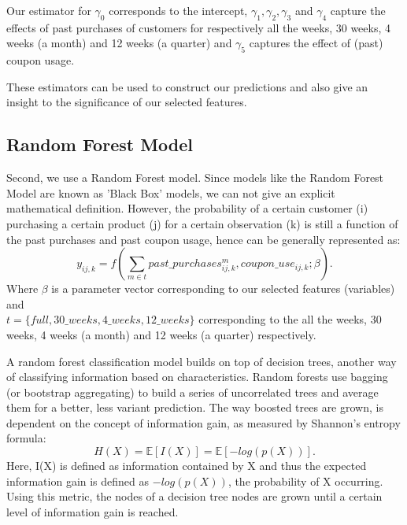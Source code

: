 Our estimator for $\gamma_{0}$ corresponds to the intercept, 
$\gamma_{1}, \gamma_{2}, \gamma_{3}$ and $\gamma_{4}$ capture the effects of past 
purchases of customers for respectively all the weeks, 30 weeks, 4 weeks (a
month) and 12 weeks (a quarter) and $\gamma_{5}$ captures the effect of (past) coupon usage.

These estimators can be used
to construct our predictions and also give an insight to the significance of our
selected features.

\subsection{Random Forest Model}
Second, we use a Random Forest model. Since models like the Random Forest Model
are known as 'Black Box' models, we can not give an explicit mathematical
definition. However, the probability of a certain customer (i) purchasing a certain
product (j) for a certain observation (k) is still a function of the past
purchases and past coupon usage, hence can be generally represented as:
\begin{equation}
    y_{ij,k} = f(\sum_{m \in t} past\_purchases_{ij,k}^{m}, coupon\_use_{ij,k}; \beta).
\end{equation} Where $\beta$ is a parameter vector corresponding to our 
selected features (variables) and \\
$t = \{full, 30\_weeks,
4\_weeks, 12\_weeks\}$ corresponding to the all the weeks, 30 weeks, 4 weeks (a
month) and 12 weeks (a quarter) respectively.


A random forest classification model builds on top of decision trees, another way of 
classifying information based on characteristics. Random forests use bagging (or bootstrap aggregating) 
to build a series of uncorrelated trees and average them for a better, less variant prediction. 
The way boosted trees are grown, is dependent on the concept of information gain, 
as measured by Shannon’s entropy formula:
\begin{equation}
    H(X) = \mathbb{E}\left[ I(X) \right] = \mathbb{E}\left[ -log(p(X)) \right].
\end{equation}
Here, I(X) is defined as information contained by X and thus the expected information gain 
is defined as $-log(p(X))$, the probability of X occurring. Using this metric, the nodes of a 
decision tree nodes are grown until a certain level of information gain is reached.

